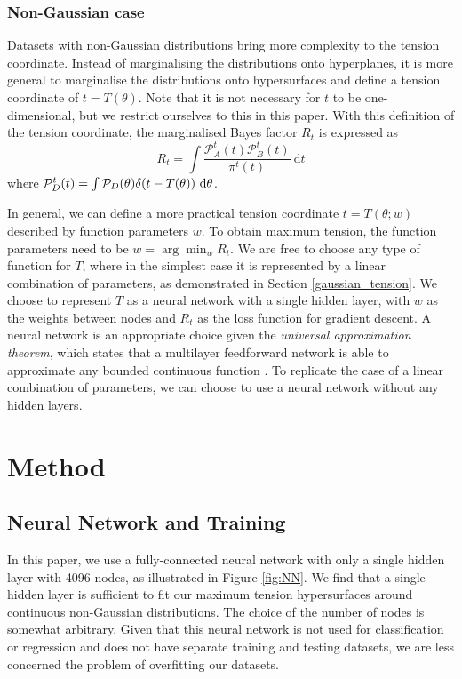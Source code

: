 \documentclass[%
 reprint,
 amsmath,amssymb,
 aps,
]{revtex4-2}
\begin{document}
\subsubsection{Non-Gaussian case} \label{non_gaussian}

Datasets with non-Gaussian distributions bring more complexity to the tension coordinate. Instead of marginalising the distributions onto hyperplanes, it is more general to marginalise the distributions onto hypersurfaces and define a tension coordinate of $t = T(\theta)$. Note that it is not necessary for $t$ to be one-dimensional, but we restrict ourselves to this in this paper. With this definition of the tension coordinate, the marginalised Bayes factor $R_t$ is expressed as
\begin{equation} \label{margin_R}
    R_t = \int \frac{\mathcal{P}_A^{t}(t) \mathcal{P}_B^{t}(t)}{\pi^{t}(t)} \ \textrm{d}t
\end{equation}
where $\mathcal{P}_D^{t}(t) = \int \mathcal{P}_D(\theta) \delta(t - T(\theta)) \ \rm{d}\theta$.

In general, we can define a more practical tension coordinate $t = T(\theta; w)$ described by function parameters $w$. To obtain maximum tension, the function parameters need to be $w = \arg \min_w R_t$. We are free to choose any type of function for $T$, where in the simplest case it is represented by a linear combination of parameters, as demonstrated in Section \ref{gaussian_tension}. We choose to represent $T$ as a neural network with a single hidden layer, with $w$ as the weights between nodes and $R_t$ as the loss function for gradient descent. A neural network is an appropriate choice given the \textit{universal approximation theorem}, which states that a multilayer feedforward network is able to approximate any bounded continuous function \cite{Hornik1989}. To replicate the case of a linear combination of parameters, we can choose to use a neural network without any hidden layers.


\section{Method}

\subsection{Neural Network and Training}

In this paper, we use a fully-connected neural network with only a single hidden layer with 4096 nodes, as illustrated in Figure \ref{fig:NN}. We find that a single hidden layer is sufficient to fit our maximum tension hypersurfaces around continuous non-Gaussian distributions. The choice of the number of nodes is somewhat arbitrary. Given that this neural network is not used for classification or regression and does not have separate training and testing datasets, we are less concerned the problem of overfitting our datasets. 
\end{document}
